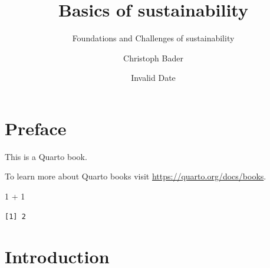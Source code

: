 \documentclass[
  letterpaper,
  DIV=11,
  numbers=noendperiod]{scrreprt}
\title{Basics of sustainability}
\subtitle{Foundations and Challenges of sustainability}
\author{Christoph Bader}
\date{Invalid Date}
\newenvironment{Shaded}{\begin{snugshade}}{\end{snugshade}}
\newcommand{\DecValTok}[1]{\textcolor[rgb]{0.68,0.00,0.00}{#1}}
\newcommand{\SpecialCharTok}[1]{\textcolor[rgb]{0.37,0.37,0.37}{#1}}
\renewcommand*\contentsname{Table of contents}
\newcommand\contentsname{Table of contents}
\begin{document}
\maketitle

\renewcommand*\contentsname{Table of contents}
{
\hypersetup{linkcolor=}
\setcounter{tocdepth}{2}
\tableofcontents
}


\chapter*{Preface}\label{preface}


This is a Quarto book.

To learn more about Quarto books visit
\url{https://quarto.org/docs/books}.

\begin{Shaded}
\begin{Highlighting}[]
\DecValTok{1} \SpecialCharTok{+} \DecValTok{1}
\end{Highlighting}
\end{Shaded}

\begin{verbatim}
[1] 2
\end{verbatim}


\chapter{Introduction}\label{introduction}
\end{document}
